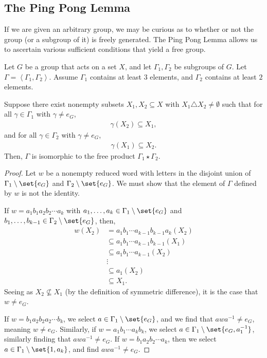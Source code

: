 \subsection{The Ping Pong Lemma}%
If we are given an arbitrary group, we may be curious as to whether or not the group (or a subgroup of it) is freely generated. The Ping Pong Lemma allows us to ascertain various sufficient conditions that yield a free group.
\begin{theorem}
  Let $G$ be a group that acts on a set $X$, and let $\Gamma_1,\Gamma_2$ be subgroups of $G$. Let $\Gamma = \left\langle \Gamma_1,\Gamma_2 \right\rangle$. Assume $\Gamma_1$ contains at least $3$ elements, and $\Gamma_2$ contains at least $2$ elements.\newline

  Suppose there exist nonempty subsets $X_1,X_2\subseteq X$ with $X_1\triangle X_2 \neq \emptyset$ such that for all $\gamma\in \Gamma_1$ with $\gamma \neq e_{G}$,
  \begin{align*}
    \gamma\left(X_2\right)\subseteq X_1,
  \end{align*}
  and for all $\gamma \in \Gamma_2$ with $\gamma \neq e_G$,
  \begin{align*}
    \gamma\left(X_1\right)\subseteq X_2.
  \end{align*}
  Then, $\Gamma$ is isomorphic to the free product $\Gamma_1\star \Gamma_2$.\label{thm:ping_pong}
\end{theorem}
\begin{proof}
  Let $w$ be a nonempty reduced word with letters in the disjoint union of $\Gamma_1\setminus \set{e_G}$ and $\Gamma_2\setminus \set{e_G}$. We must show that the element of $\Gamma$ defined by $w$ is not the identity.\newline

  If $w = a_1b_1a_2b_2\cdots a_k$ with $a_1,\dots,a_k\in \Gamma_1\setminus \set{e_G}$ and $b_1,\dots,b_{k-1}\in \Gamma_{2}\setminus \set{e_G}$, then,
  \begin{align*}
    w\left(X_2\right) &= a_1b_1\cdots a_{k-1}b_{k-1}a_k\left(X_2\right)\\
                      &\subseteq a_1b_1\cdots a_{k-1}b_{k-1}\left(X_1\right)\\
                      &\subseteq a_1b_1\cdots a_{k-1}\left(X_2\right)\\
                      &\vdots\\
                      &\subseteq a_1\left(X_2\right)\\
                      &\subseteq X_1.
  \end{align*}
  Seeing as $X_2\nsubseteq X_1$ (by the definition of symmetric difference), it is the case that $w\neq e_{G}$.\newline

  If $w = b_1a_2b_2a_2\cdots b_k$, we select $a\in \Gamma_1\setminus \set{e_G}$, and we find that $awa^{-1}\neq e_G$, meaning $w\neq e_G$. Similarly, if $w = a_1b_1\cdots a_kb_k$, we select $a\in \Gamma_1\setminus \set{e_G,a_{1}^{-1}}$, similarly finding that $awa^{-1}\neq e_{G}$. If $w = b_1a_2b_2\cdots a_k$, then we select $a\in \Gamma_1\setminus \set{1,a_k}$, and find $awa^{-1}\neq e_G$.
\end{proof}

